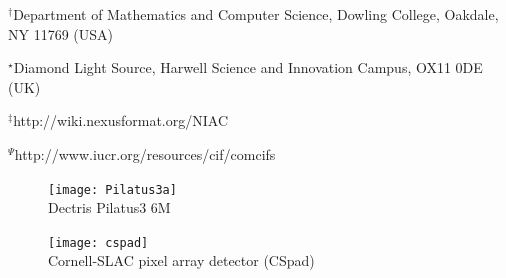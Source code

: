 \documentclass[11pt]{a0poster}
\begin{document}
\begin{minipage}[]{.4\linewidth}
\begin{center}
\vspace{8mm}

{\fontsize{24}{28}\selectfont $^{\dagger}$Department of Mathematics and Computer Science, Dowling College, Oakdale, NY 11769 (USA)}

{\fontsize{24}{28}\selectfont $^{\star}$Diamond Light Source, Harwell Science and
Innovation Campus, OX11 0DE (UK)}

{\fontsize{24}{28}\selectfont $^{\ddag}${http://wiki.nexusformat.org/NIAC}}

{\fontsize{24}{28}\selectfont $^{\Psi}${http://www.iucr.org/resources/cif/comcifs}}
\vspace{4mm}
\end{center}
\end{minipage}\hfill%
\begin{minipage}[]{.10\linewidth}
\begin{figure}[H]
\begin{center}
\vspace{-10mm}
\texttt{[image: Pilatus3a]}
{~~\\
\vspace{-8mm}
Dectris Pilatus3 6M}
\end{center}
\end{figure}
\end{minipage}\hfill%
\begin{minipage}[]{.10\linewidth}
\begin{figure}[H]
\begin{center}
\hspace{-10mm}\texttt{[image: cspad]}
{~\\
\vspace{-2mm}
Cornell-SLAC pixel array detector (CSpad) }
\end{center}
\end{figure}
\end{minipage}
\\
\fontsize{18}{22}\selectfont
\end{document}
